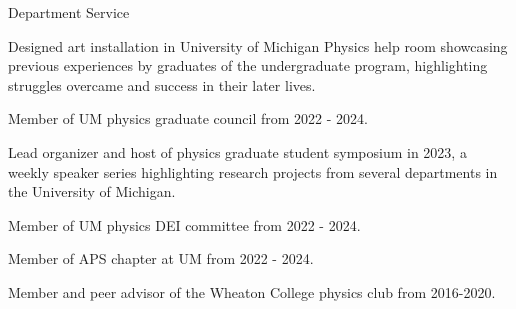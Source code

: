 \documentclass{resume} %
\begin{document}

\begin{rSection}{Department Service}
    \begin{itemize}
        \item Designed art installation in University of Michigan Physics help room showcasing previous experiences by graduates of the undergraduate program, highlighting struggles overcame and success in their later lives.
        \item{Member of UM physics graduate council from 2022 - 2024. 
        \item Lead organizer and host of physics graduate student symposium in 2023, a weekly speaker series highlighting research projects from several departments in the University of Michigan.}
    \item{Member of UM physics DEI committee from 2022 - 2024.}
    \item Member of APS chapter at UM from 2022 - 2024.
    \item Member and peer advisor of the Wheaton College physics club from 2016-2020.
    \end{itemize}
    \end{rSection}
    
                

\end{document}
